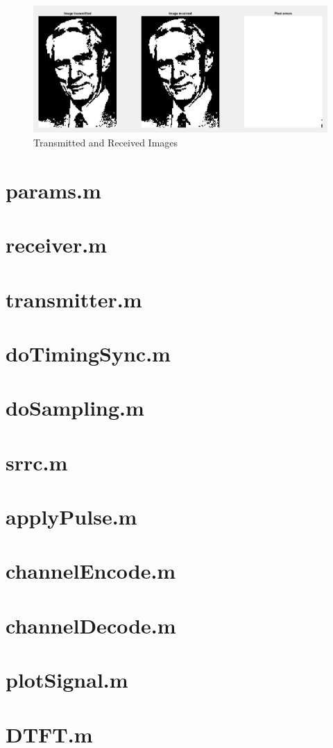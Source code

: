\documentclass{article}
\newcommand{\file}[1]{\section{#1}}
\begin{document}
\begin{figure}
  \centering\includegraphics[width=\textwidth]{../presentation/images.png}
  \caption{Transmitted and Received Images}
  \label{fig:pics}
\end{figure}


\clearpage
\appendix
\file{params.m}
\file{receiver.m}
\file{transmitter.m}
\file{doTimingSync.m}
\file{doSampling.m}
\file{srrc.m}
\file{applyPulse.m}
\file{channelEncode.m}
\file{channelDecode.m}
\file{plotSignal.m}
\file{DTFT.m}
\end{document}
